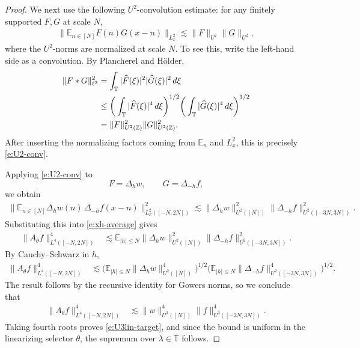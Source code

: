 \documentclass[12pt]{amsart}
\numberwithin{equation}{section}
\theoremstyle{definition}
\begin{document}
\begin{proof}
We next use the following \(U^2\)-convolution estimate: for any finitely supported \(F,G\) at
scale \(N\),
\begin{align}\label{e:U2-conv}
    \Big\|
    \mathbb E_{n \in [N]} F(n)G(x-n)
    \Big\|_{L^2_x}
    \lesssim
    \|F\|_{U^2}\|G\|_{U^2},
\end{align}
where the \(U^2\)-norms are normalized at scale \(N\). To see this, write the left-hand
side as a convolution. By Plancherel and Hölder,
\begin{align}
    \|F*G\|_{\ell^2}^2
    &=
    \int_{\mathbb T} |\widehat F(\xi)|^2|\widehat G(\xi)|^2\,d\xi
    \notag\\
    &\leq
    \bigg(\int_{\mathbb T}|\widehat F(\xi)|^4\,d\xi\bigg)^{1/2}
    \bigg(\int_{\mathbb T}|\widehat G(\xi)|^4\,d\xi\bigg)^{1/2}
    \notag\\
    &=
    \|F\|_{U^2(\mathbb Z)}^2\|G\|_{U^2(\mathbb Z)}^2.
\end{align}
After inserting the normalizing factors coming from \(\mathbb E_n\) and
\(L^2_x\), this is precisely \eqref{e:U2-conv}.

Applying \eqref{e:U2-conv} to
\[
    F=\Delta_h w,
    \qquad
    G=\Delta_{-h}f,
\]
we obtain
\begin{align}
    \Big\|
    \mathbb E_{n \in [N]}
    \Delta_h w(n)\,
    \Delta_{-h} f(x-n)
    \Big\|_{L^2_x([-N,2N])}^2
    \lesssim
    \|\Delta_h w\|_{U^2([N])}^2
    \|\Delta_{-h}f\|_{U^2([-3N,3N])}^2.
\end{align}
Substituting this into \eqref{e:xh-average} gives
\begin{align}
    \|A_\theta f\|_{L^4([-N,2N])}^4
    &\lesssim
    \mathbb E_{|h|\leq N}
    \|\Delta_h w\|_{U^2([N])}^2
    \|\Delta_{-h}f\|_{U^2([-3N,3N])}^2.
\end{align}
By Cauchy--Schwarz in \(h\),
\begin{align}
    \|A_\theta f\|_{L^4([-N,2N])}^4
    &\lesssim
    \bigg(
    \mathbb E_{|h|\leq N}
    \|\Delta_h w\|_{U^2([N])}^4
    \bigg)^{1/2}
    \bigg(
    \mathbb E_{|h|\leq N}
    \|\Delta_{-h}f\|_{U^2([-3N,3N])}^4
    \bigg)^{1/2}.
\end{align}
The result follows by the recursive identity for Gowers norms, so we conclude that
\begin{align}
    \|A_\theta f\|_{L^4([-N,2N])}^4
    &\lesssim
    \|w\|_{U^3([N])}^4
    \|f\|_{U^3([-3N,3N])}^4.
\end{align}
Taking fourth roots proves \eqref{e:U3lin-target}, and since the bound is uniform in the linearizing selector \(\theta\), the supremum over \(\lambda\in\mathbb T\) follows.


\end{proof}
\end{document}
